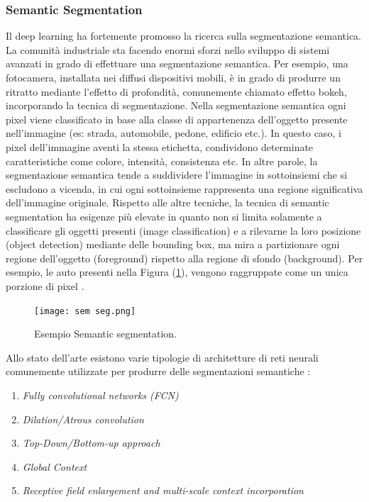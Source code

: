 \subsubsection{Semantic Segmentation}
Il deep learning ha fortemente promosso la ricerca sulla segmentazione semantica. 
La comunità industriale sta facendo enormi sforzi nello sviluppo di sistemi avanzati 
in grado di effettuare una segmentazione semantica. Per esempio, una fotocamera, 
installata nei diffusi dispositivi mobili, è in grado di produrre un ritratto mediante 
l’effetto di profondità, comunemente chiamato effetto bokeh, incorporando la tecnica 
di segmentazione. Nella segmentazione semantica ogni pixel viene classificato 
in base alla classe di appartenenza dell’oggetto presente nell’immagine (es: strada, 
automobile, pedone, edificio etc.). In questo caso, i pixel dell’immagine aventi la 
stessa etichetta, condividono determinate caratteristiche come colore, intensità, 
consistenza etc. In altre parole, la segmentazione semantica tende a suddividere 
l’immagine in sottoinsiemi che si escludono a vicenda, in cui ogni sottoinsieme 
rappresenta una regione significativa dell’immagine originale. Rispetto alle altre 
tecniche, la tecnica di semantic segmentation ha esigenze più elevate in quanto 
non si limita solamente a classificare gli oggetti presenti (image classification) e a 
rilevarne la loro posizione (object detection) mediante delle bounding box, ma 
mira a partizionare ogni regione dell’oggetto (foreground) rispetto alla regione 
di sfondo (background). Per esempio, le auto presenti nella Figura (\ref{semantic segmentation}), vengono 
raggruppate come un unica porzione di pixel \cite{aurelien}.
\begin{figure}
    \centering
    \texttt{[image: sem seg.png]}
    \centering
    \caption{Esempio Semantic segmentation.}
    \label{semantic segmentation}
\end{figure}
Allo stato dell’arte esistono varie tipologie di architetture di reti neurali 
comunemente utilizzate per produrre delle segmentazioni semantiche \cite{semantic_segmentation_networks}:
\begin{enumerate}
    \item \emph{Fully convolutional networks (FCN)}
    \item \emph{Dilation/Atrous convolution}
    \item \emph{Top-Down/Bottom-up approach}
    \item \emph{Global Context}
    \item \emph{Receptive field enlargement and multi-scale context incorporation}
\end{enumerate}

